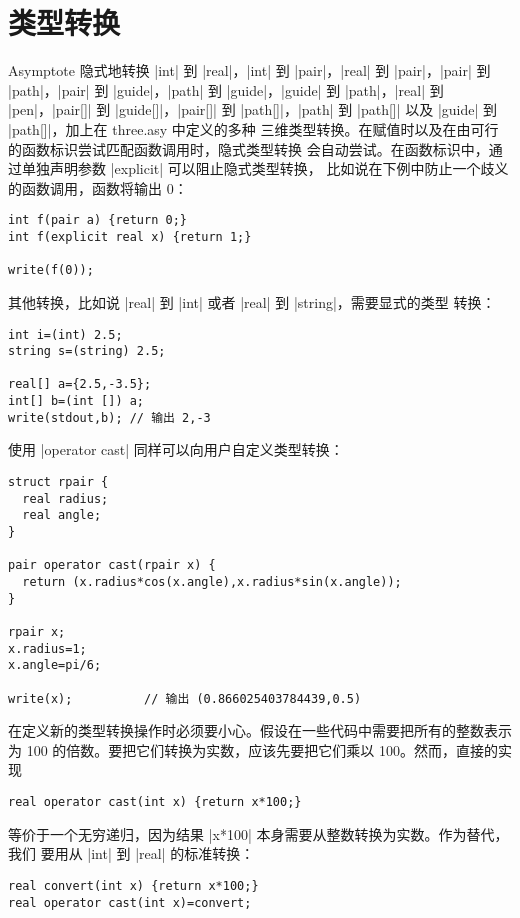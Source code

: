 \documentclass[nofonts,CJKnormalspaces]{ctexbook}[2009/05/20]
\newcommand*\prgname[1]{\textsf{#1}}
\begin{document}
{{{\section{类型转换}
\label{sec:casts}

\prgname{Asymptote} 隐式地转换 |int| 到 |real|，|int| 到 |pair|，|real| 到
|pair|，|pair| 到 |path|，|pair| 到 |guide|，|path| 到 |guide|，|guide| 到
|path|，|real| 到 |pen|，|pair[]| 到 |guide[]|，|pair[]| 到 |path[]|，|path|
到 |path[]| 以及 |guide| 到 |path[]|，加上在 \prgname{three.asy} 中定义的多种
三维类型转换。在赋值时以及在由可行的函数标识尝试匹配函数调用时，隐式类型转换
会自动尝试。在函数标识中，通过单独声明参数 |explicit| 可以阻止隐式类型转换，
比如说在下例中防止一个歧义的函数调用，函数将输出 0：
\begin{lstlisting}
int f(pair a) {return 0;}
int f(explicit real x) {return 1;}

write(f(0));
\end{lstlisting}

其他转换，比如说 |real| 到 |int| 或者 |real| 到 |string|，需要显式的类型
转换：
\begin{lstlisting}
int i=(int) 2.5;
string s=(string) 2.5;

real[] a={2.5,-3.5};
int[] b=(int []) a;
write(stdout,b); // 输出 2,-3  
\end{lstlisting}

使用 |operator cast| 同样可以向用户自定义类型转换：
\begin{lstlisting}
struct rpair {
  real radius;
  real angle;
}

pair operator cast(rpair x) {
  return (x.radius*cos(x.angle),x.radius*sin(x.angle));
}

rpair x;
x.radius=1;
x.angle=pi/6;

write(x);          // 输出 (0.866025403784439,0.5)
\end{lstlisting}

在定义新的类型转换操作时必须要小心。假设在一些代码中需要把所有的整数表示为
100 的倍数。要把它们转换为实数，应该先要把它们乘以 100。然而，直接的实现
\begin{lstlisting}
real operator cast(int x) {return x*100;}
\end{lstlisting}
等价于一个无穷递归，因为结果 |x*100| 本身需要从整数转换为实数。作为替代，我们
要用从 |int| 到 |real| 的标准转换：
\begin{lstlisting}
real convert(int x) {return x*100;}
real operator cast(int x)=convert;
\end{lstlisting}

}}}
\end{document}
